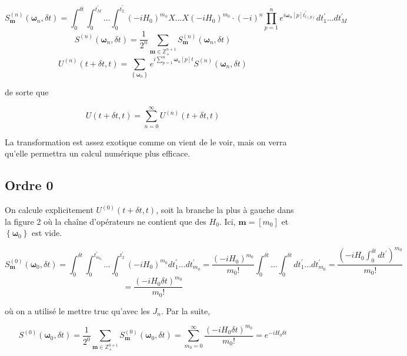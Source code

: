 \begin{equation}
    S^{(n)}_{\boldsymbol{m}}(\boldsymbol{\omega}_n, \delta t) = \int_{0}^{\delta t}\int_{0}^{t_M^{'}}...\int_{0}^{t_2^{'}} (-iH_0)^{m_n}X...X(-iH_0)^{m_0} \cdot (-i)^n \prod_{p=1}^{n}e^{i\boldsymbol{\omega}_n[p]t_{l(p)}^{'}} dt_1^{'} ... dt_M^{'}
\end{equation}
\begin{equation}
    S^{(n)}(\boldsymbol{\omega}_n, \delta t) = \frac{1}{2^n}\sum_{\boldsymbol{m} \in \mathbb{Z}^{n+1}_+} S^{(n)}_{\boldsymbol{m}}(\boldsymbol{\omega}_n, \delta t)
\end{equation}
\begin{equation}
    U^{(n)}(t + \delta t, t) = \sum_{\left\{\boldsymbol{\omega}_n\right\}}e^{i\sum_{p=1}^{n}\boldsymbol{\omega}_n[p]t}S^{(n)}(\boldsymbol{\omega}_n, \delta t)
\end{equation}

de sorte que 

\begin{equation}
    U(t+\delta t, t) = \sum_{n=0}^{\infty}U^{(n)}(t+\delta t, t)
\end{equation}

La transformation est assez exotique comme on vient de le voir, mais on verra qu'elle permettra un calcul numérique plus efficace.

\subsection{Ordre 0}
On calcule explicitement $U^{(0)}(t+\delta t, t)$, soit la branche la plus à gauche dans la figure 2 où la chaîne d'opérateurs ne contient que des $H_0$. Ici, $\boldsymbol{m} = [m_0]$ et $\left\{\boldsymbol{\omega}_0\right\}$ est vide.

\begin{equation*}
    S^{(0)}_{\boldsymbol{m}}(\boldsymbol{\omega}_0, \delta t) = \int_{0}^{\delta t}\int_{0}^{t_{m_0}^{'}}...\int_{0}^{t_2^{'}} (-iH_0)^{m_0}dt_1^{'}...dt_{m_0}^{'} = \frac{(-iH_0)^{m_0}}{m_0!}\int_{0}^{\delta t}...\int_{0}^{\delta t}dt_1^{'}...dt_{m_0}^{'} = \frac{(-iH_0\int_{0}^{\delta t}dt^{'})^{m_0}}{m_0!}
\end{equation*}
\begin{equation*}
    = \frac{(-iH_0\delta t)^{m_0}}{m_0!}
\end{equation*}

où on a utilisé le mettre truc qu'avec les $J_n$. Par la suite,

\begin{equation*}
    S^{(0)}(\boldsymbol{\omega}_0, \delta t) = \frac{1}{2^0}\sum_{\boldsymbol{m} \in \mathbb{Z}^{0+1}_{+}}S^{(0)}_{\boldsymbol{m}}(\boldsymbol{\omega}_0, \delta t) = \sum_{m_0=0}^{\infty}\frac{(-iH_0\delta t)^{m_0}}{m_0!} = e^{-iH_0\delta t}
\end{equation*}

